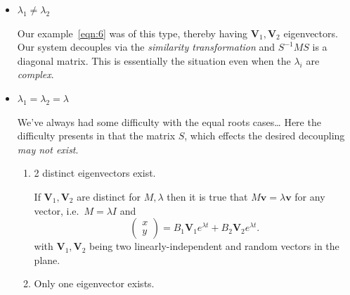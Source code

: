 \documentclass[12pt]{report}
\theoremstyle{definition}
\begin{document}
\begin{itemize}
        \item $\lambda_1 \neq \lambda_2$

            Our example~\eqref{eqn:6} was of this type, thereby having
            $\mathbf{V}_1, \mathbf{V}_2$ eigenvectors. Our system decouples via 
            the \emph{similarity transformation} and $S^{-1}MS$ is a diagonal matrix.  
            This is essentially the situation even when the $\lambda_i$ are \emph{complex}.

        \item $\lambda_1 = \lambda_2 = \lambda$

            We've always had some difficulty with the equal roots cases\ldots
            Here the difficulty presents in that the matrix $S$, which effects
            the desired decoupling \emph{may not exist}.

            \begin{enumerate}[label = (\roman*)]
                \item 2 distinct eigenvectors exist.
                    
                    If $\mathbf{V}_1, \mathbf{V}_2$ are distinct for $M, \lambda$
                    then it is true that $M\mathbf{v} = \lambda\mathbf{v}$ for any vector,
                    i.e.\ $M = \lambda I$ and\[
                        \begin{pmatrix}
                                x \\
                                y
                        \end{pmatrix} = B_1 \mathbf{V}_1 e^{\lambda t} + B_2 \mathbf{V}_2 e^{\lambda t}.
                    \]
                    with $\mathbf{V}_1, \mathbf{V}_2$ being two linearly-independent 
                    and random vectors in the plane.

                \item Only one eigenvector exists.


\end{enumerate}
\end{itemize}
\end{document}
